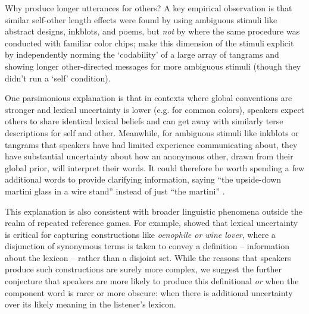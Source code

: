Why produce longer utterances for others? A key empirical observation is that similar self-other length effects were found by  using ambiguous stimuli like abstract designs, inkblots, and poems, but \emph{not} by  where the same procedure was conducted with familiar color chips;  make this dimension of the stimuli explicit by independently norming the `codability' of a large array of tangrams and showing longer other-directed messages for more ambiguous stimuli (though they didn't run a `self' condition).

One parsimonious explanation is that in contexts where global conventions are stronger and lexical uncertainty is lower (e.g. for common colors), speakers expect others to share identical lexical beliefs and can get away with similarly terse descriptions for self and other. Meanwhile, for ambiguous stimuli like inkblots or tangrams that speakers have had limited experience communicating about, they have substantial uncertainty about how an anonymous other, drawn from their global prior, will interpret their words. %
It could therefore be worth spending a few additional words to provide clarifying information, saying ``the upside-down martini glass in a wire stand'' instead of just ``the martini'' \cite{HawkinsFrankGoodman17_ConventionFormation}.  %


This explanation is also consistent with broader linguistic phenomena outside the realm of repeated reference games. For example,  showed that lexical uncertainty is critical for capturing constructions like \emph{oenophile or wine lover}, where a disjunction of synonymous terms is taken to convey a definition -- information about the lexicon -- rather than a disjoint set. While the reasons that speakers produce such constructions are surely more complex, we suggest the further conjecture that speakers are more likely to produce this definitional \emph{or} when the component word is rarer or more obscure: when there is additional uncertainty over its likely meaning in the listener's lexicon. 

